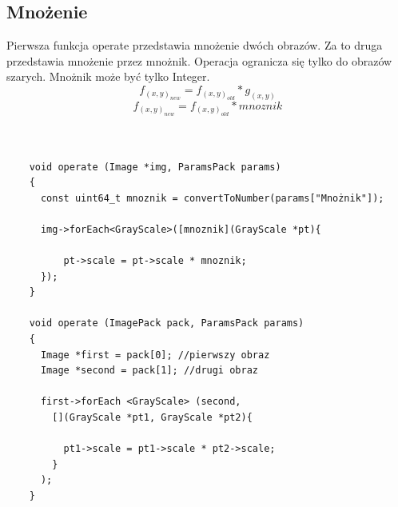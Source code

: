\documentclass{article}
\begin{document}
\FloatBarrier
\subsection{Mnożenie}
Pierwsza funkcja operate przedstawia mnożenie dwóch obrazów. Za to druga przedstawia mnożenie przez mnożnik. Operacja ogranicza się tylko do obrazów szarych. Mnożnik może być tylko Integer.
\begin{equation*}
f_(x,y)_{new} = f_(x,y)_{old}*g_(x,y)
\end{equation*}
\begin{equation*}
f_(x,y)_{new} = f_(x,y)_{old}*mnoznik
\end{equation*}\\
\begin{Verbatim}[frame=single,label=Mnożenie (Source Code)]
    
    void operate (Image *img, ParamsPack params)
    {
      const uint64_t mnoznik = convertToNumber(params["Mnożnik"]);

      img->forEach<GrayScale>([mnoznik](GrayScale *pt){
      
          pt->scale = pt->scale * mnoznik;
      });
    }

    void operate (ImagePack pack, ParamsPack params)
    {
      Image *first = pack[0]; //pierwszy obraz
      Image *second = pack[1]; //drugi obraz

      first->forEach <GrayScale> (second,
        [](GrayScale *pt1, GrayScale *pt2){
        
          pt1->scale = pt1->scale * pt2->scale;
        }
      );
    }
    
\end{Verbatim}
\end{document}
